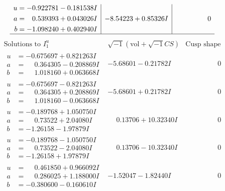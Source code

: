 \documentclass[1p]{elsarticle_modified}
\theoremstyle{definition}
\newcommand{\I}{\sqrt{-1}}
\begin{document}
$$\begin{array}{c|c|c}
\begin{aligned}
u &= -0.922781 - 0.181538 I \\
a &= \phantom{-}0.539393 + 0.043026 I \\
b &= -1.098240 + 0.402940 I\end{aligned}
 & -8.54223 + 0.85326 I & \phantom{-0.000000 } 0\\
 \hline 
 \end{array}$$\newpage$$\begin{array}{c|c|c}  
\text{Solutions to }I^u_{1}& \I (\text{vol} + \sqrt{-1}CS) & \text{Cusp shape}\\
 \hline 
\begin{aligned}
u &= -0.675697 + 0.821263 I \\
a &= \phantom{-}0.364305 - 0.208869 I \\
b &= \phantom{-}1.018160 + 0.063668 I\end{aligned}
 & -5.68601 - 0.21782 I & \phantom{-0.000000 } 0 \\ \hline\begin{aligned}
u &= -0.675697 - 0.821263 I \\
a &= \phantom{-}0.364305 + 0.208869 I \\
b &= \phantom{-}1.018160 - 0.063668 I\end{aligned}
 & -5.68601 + 0.21782 I & \phantom{-0.000000 } 0 \\ \hline\begin{aligned}
u &= -0.189768 + 1.050750 I \\
a &= \phantom{-}0.73522 + 2.04080 I \\
b &= -1.26158 - 1.97879 I\end{aligned}
 & \phantom{-}0.13706 + 10.32340 I & \phantom{-0.000000 } 0 \\ \hline\begin{aligned}
u &= -0.189768 - 1.050750 I \\
a &= \phantom{-}0.73522 - 2.04080 I \\
b &= -1.26158 + 1.97879 I\end{aligned}
 & \phantom{-}0.13706 - 10.32340 I & \phantom{-0.000000 } 0 \\ \hline\begin{aligned}
u &= \phantom{-}0.461850 + 0.966092 I \\
a &= \phantom{-}0.286025 + 1.188000 I \\
b &= -0.380600 - 0.160610 I\end{aligned}
 & -1.52047 - 1.82440 I & \phantom{-0.000000 } 0 \\ \hline\begin{aligned}

\end{aligned}
\end{array}$$
\end{document}

